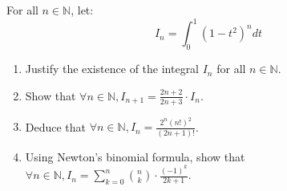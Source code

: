 \documentclass[12pt]{article}
\begin{document}
\newpage

\section{}
For all $n \in \mathbb{N}$, let:
$$I_n = \int_0^1 (1 - t^2)^n dt$$

\begin{enumerate}
    \item Justify the existence of the integral $I_n$ for all $n \in \mathbb{N}$.
    \item Show that $\forall n \in \mathbb{N}, I_{n+1} = \frac{2n + 2}{2n + 3} \cdot I_n$.
    \item Deduce that $\forall n \in \mathbb{N}, I_n = \frac{2^n(n!)^2}{(2n + 1)!}$.
    \item Using Newton's binomial formula, show that $\forall n \in \mathbb{N}, I_n = \sum_{k=0}^n \binom{n}{k} \cdot \frac{(-1)^k}{2k + 1}$.
\end{enumerate}

\newpage
\end{document}
